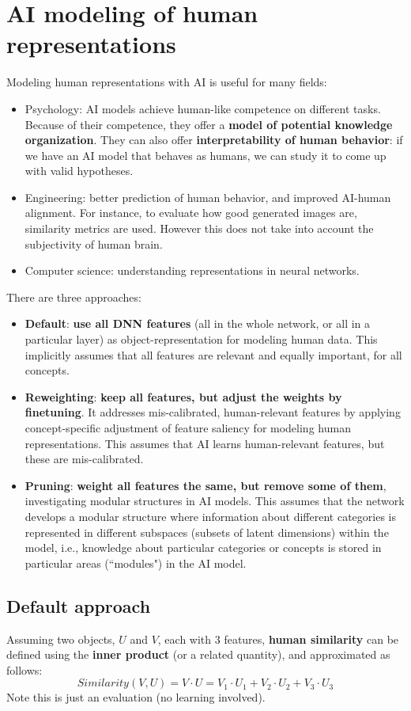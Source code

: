\section{AI modeling of human representations}
Modeling human representations with AI is useful for many fields:
\begin{itemize}
    \item Psychology: AI models achieve human-like competence on different tasks. Because of their competence, they offer a \textbf{model of potential knowledge organization}. They can also offer \textbf{interpretability of human behavior}: if we have an AI model that behaves as humans, we can study it to come up with valid hypotheses.
    \item Engineering: better prediction of human behavior, and improved AI-human alignment. For instance, to evaluate how good generated images are, similarity metrics are used. However this does not take into account the subjectivity of human brain.
    \item Computer science: understanding representations in neural networks.
\end{itemize}

There are three approaches:
\begin{itemize}
    \item \textbf{Default}: \textbf{use all DNN features} (all in the whole network, or all in a particular layer) as object-representation for modeling human data. This implicitly assumes that all features are relevant and equally important, for all concepts.
    \item \textbf{Reweighting}: \textbf{keep all features, but adjust the weights by finetuning}. It addresses mis-calibrated, human-relevant features by applying concept-specific adjustment of feature saliency for modeling human representations. This assumes that AI learns human-relevant features, but these are mis-calibrated.
    \item \textbf{Pruning}: \textbf{weight all features the same, but remove some of them}, investigating modular structures in AI models. This assumes that the network develops a modular structure where information about different categories is represented in different subspaces (subsets of latent dimensions) within the model, i.e., knowledge about particular categories or concepts is stored in particular areas (``modules") in the AI model.
\end{itemize}

\subsection{Default approach}
Assuming two objects, $U$ and $V$, each with 3 features, \textbf{human similarity} can be defined using the \textbf{inner product} (or a related quantity), and approximated as follows:
\[
    Similarity(V,U) = V \cdot U = V_1 \cdot U_1 +  V_2 \cdot U_2 + V_3 \cdot U_3
\]
Note this is just an evaluation (no learning involved).

